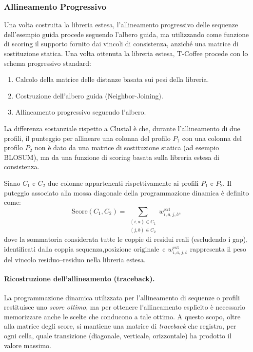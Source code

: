\subsubsection{Allineamento Progressivo}
Una volta costruita la libreria estesa, l’allineamento progressivo delle
sequenze dell’esempio guida procede seguendo l’albero guida, ma utilizzando
come funzione di scoring il supporto fornito dai vincoli di consistenza,
anziché una matrice di sostituzione statica.
Una volta ottenuta la libreria estesa, T-Coffee procede con lo schema progressivo standard:
\begin{enumerate}
    \item Calcolo della matrice delle distanze basata sui pesi della libreria.
    \item Costruzione dell'albero guida (Neighbor-Joining).
    \item Allineamento progressivo seguendo l'albero.
\end{enumerate}
La differenza sostanziale rispetto a Clustal è che, durante l'allineamento di due profili, 
il punteggio per allineare una colonna del profilo $P_1$ con una colonna del profilo $P_2$ 
non è dato da una matrice di sostituzione statica (ad esempio BLOSUM), ma
da una funzione di scoring basata sulla libreria estesa di consistenza.

Siano $C_1$ e $C_2$ due colonne appartenenti rispettivamente ai profili
$P_1$ e $P_2$. Il puteggio associato alla mossa diagonale della programmazione
dinamica è definito come:
\[
\mathrm{Score}(C_1,C_2)
=
\sum_{\substack{(i,a)\in C_1\\(j,b)\in C_2}}
w^{\text{ext}}_{i,a,j,b},
\]
dove la sommatoria considerata tutte le coppie di residui reali (escludendo
i gap), identificati dalla coppia \(\text{sequenza},\text{posizione originale}\)
e  $w^{\text{ext}}_{i,a,j,b}$ rappresenta il peso del vincolo residuo--residuo
nella libreria estesa.

\paragraph{Ricostruzione dell’allineamento (traceback).}
La programmazione dinamica utilizzata per l’allineamento di sequenze o profili
restituisce uno \emph{score ottimo}, ma per ottenere l’allineamento esplicito è
necessario memorizzare anche le scelte che conducono a tale ottimo. A questo
scopo, oltre alla matrice degli score, si mantiene una matrice di \emph{traceback}
che registra, per ogni cella, quale transizione (diagonale, verticale, orizzontale)
ha prodotto il valore massimo.

